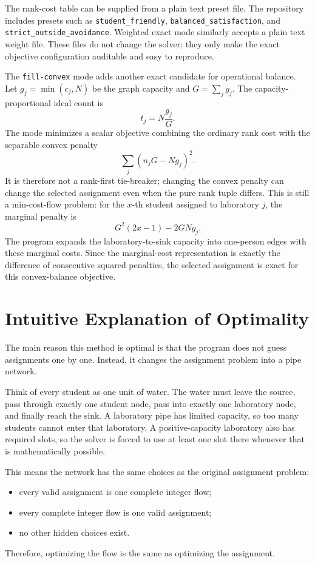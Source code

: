\documentclass[11pt,a4paper]{article}
\begin{document}
The rank-cost table can be supplied from a plain text preset file.  The
repository includes presets such as \texttt{student\_friendly},
\texttt{balanced\_satisfaction}, and \texttt{strict\_outside\_avoidance}.
Weighted exact mode similarly accepts a plain text weight file.  These files
do not change the solver; they only make the exact objective configuration
auditable and easy to reproduce.

The \texttt{fill-convex} mode adds another exact candidate for operational
balance.  Let \(g_j=\min(c_j,N)\) be the graph capacity and
\(G=\sum_j g_j\).  The capacity-proportional ideal count is
\[
  t_j = N\frac{g_j}{G}.
\]
The mode minimizes a scalar objective combining the ordinary rank cost with the
separable convex
penalty
\[
  \sum_j (n_jG-Ng_j)^2.
\]
It is therefore not a rank-first tie-breaker; changing the convex penalty can
change the selected assignment even when the pure rank tuple differs.
This is still a min-cost-flow problem: for the \(x\)-th student assigned to
laboratory \(j\), the marginal penalty is
\[
  G^2(2x-1)-2GNg_j.
\]
The program expands the laboratory-to-sink capacity into one-person edges with
these marginal costs.  Since the marginal-cost representation is exactly the
difference of consecutive squared penalties, the selected assignment is exact
for this convex-balance objective.

\section{Intuitive Explanation of Optimality}

The main reason this method is optimal is that the program does not guess
assignments one by one.  Instead, it changes the assignment problem into a
pipe network.

Think of every student as one unit of water.  The water must leave the source,
pass through exactly one student node, pass into exactly one laboratory node,
and finally reach the sink.  A laboratory pipe has limited capacity, so too
many students cannot enter that laboratory.  A positive-capacity laboratory
also has required slots, so the solver is forced to use at least one slot
there whenever that is mathematically possible.

This means the network has the same choices as the original assignment
problem:
\begin{itemize}[leftmargin=2em]
  \item every valid assignment is one complete integer flow;
  \item every complete integer flow is one valid assignment;
  \item no other hidden choices exist.
\end{itemize}
Therefore, optimizing the flow is the same as optimizing the assignment.
\end{document}
